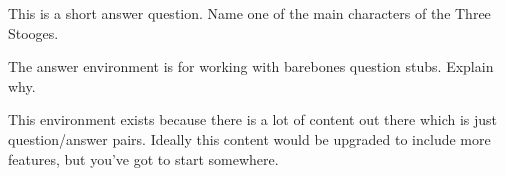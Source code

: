 \documentclass{article}
\begin{document}
\begin{question}
This is a short answer question. Name one of the main characters of the Three Stooges. 
\begin{shortanswer}
\end{shortanswer}
\end{question}

\begin{question}
The answer environment is for working with barebones question stubs. Explain why.
\begin{answer}
This environment exists because there is a lot of content out there which is just question/answer pairs. Ideally this content would be upgraded to include more features, but you've got to start somewhere.
\end{answer}
\end{question}



\end{document}
